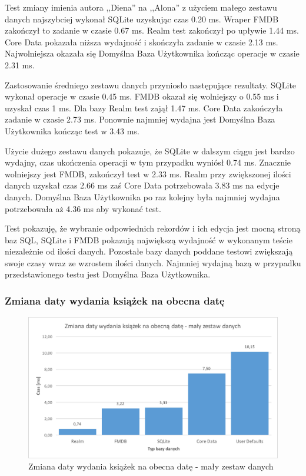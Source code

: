 Test zmiany imienia autora ,,Diena'' na ,,Alona'' z użyciem małego zestawu danych najszybciej wykonał SQLite uzyskując czas 0.20 ms. Wraper FMDB zakończył to zadanie w czasie 0.67 ms. Realm test zakończył po upływie 1.44 ms. Core Data pokazała niższa wydajność i skończyła zadanie w czasie 2.13 ms. Najwolniejsza okazała się Domyślna Baza Użytkownika kończąc operacje w czasie 2.31 ms. 

Zastosowanie średniego zestawu danych przyniosło następujące rezultaty. SQLite wykonał operacje w czasie 0.45 ms. FMDB okazał się wolniejszy o 0.55 ms i uzyskał czas 1 ms. Dla bazy Realm test zajął 1.47 ms. Core Data zakończyła zadanie w czasie 2.73 ms. Ponownie najmniej wydajna jest Domyślna Baza Użytkownika kończąc test w 3.43 ms.

Użycie dużego zestawu danych pokazuje, że SQLite w dalszym ciągu jest bardzo wydajny, czas ukończenia operacji w tym przypadku wyniósł 0.74 ms. Znacznie wolniejszy jest FMDB, zakończył test w 2.33 ms. Realm przy zwiększonej ilości danych uzyskał czas 2.66 ms zaś Core Data potrzebowała 3.83 ms na edycje danych. Domyślna Baza Użytkownika po raz kolejny była najmniej wydajna potrzebowała aż 4.36 ms aby wykonać test. 

Test pokazuję, że wybranie odpowiednich rekordów i ich edycja jest mocną stroną baz SQL, SQLite i FMDB pokazują największą wydajność w wykonanym teście niezależnie od ilości danych. Pozostałe bazy danych poddane testowi zwiększają swoje czasy wraz ze wzrostem ilości danych. Najmniej wydajną bazą w przypadku przedstawionego testu jest Domyślna Baza Użytkownika. 

\subsubsection{Zmiana daty wydania książek na obecna datę}

\begin{figure}[H]
    \centering\includegraphics[width=\linewidth]{img/update_data/update_book/update_book_small_test.png}
    \caption{Zmiana daty wydania książek na obecna datę - mały zestaw danych}
    \label{img: update-by-book-small}
\end{figure}

